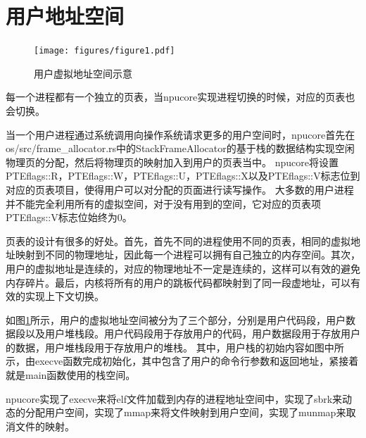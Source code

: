 \section{用户地址空间}
\begin{figure}[htb]
    \centering
    \texttt{[image: figures/figure1.pdf]}
    \caption{
        用户虚拟地址空间示意
    }
    \label{fig:user virtual process}
\end{figure}
每一个进程都有一个独立的页表，当npucore实现进程切换的时候，对应的页表也会切换。

当一个用户进程通过系统调用向操作系统请求更多的用户空间时，npucore首先在os/src/frame_allocator.rs中的StackFrameAllocator的基于栈的数据结构实现空闲物理页的分配，然后将物理页的映射加入到用户的页表当中。
npucore将设置PTEflags::R，PTEflags::W，PTEflags::U，PTEflags::X以及PTEflags::V标志位到对应的页表项目，使得用户可以对分配的页面进行读写操作。
大多数的用户进程并不能完全利用所有的虚拟空间，对于没有用到的空间，它对应的页表项PTEflags::V标志位始终为0。

页表的设计有很多的好处。首先，首先不同的进程使用不同的页表，相同的虚拟地址映射到不同的物理地址，因此每一个进程可以拥有自己独立的内存空间。其次，用户的虚拟地址是连续的，对应的物理地址不一定是连续的，这样可以有效的避免内存碎片。最后，内核将所有的用户的跳板代码都映射到了同一段虚地址，可以有效的实现上下文切换。

如图\ref{fig:user virtual process}所示，用户的虚拟地址空间被分为了三个部分，分别是用户代码段，用户数据段以及用户堆栈段。用户代码段用于存放用户的代码，用户数据段用于存放用户的数据，用户堆栈段用于存放用户的堆栈。
其中，用户栈的初始内容如图中所示，由execve函数完成初始化，其中包含了用户的命令行参数和返回地址，紧接着就是main函数使用的栈空间。

npucore实现了execve来将elf文件加载到内存的进程地址空间中，实现了sbrk来动态的分配用户空间，实现了mmap来将文件映射到用户空间，实现了munmap来取消文件的映射。

